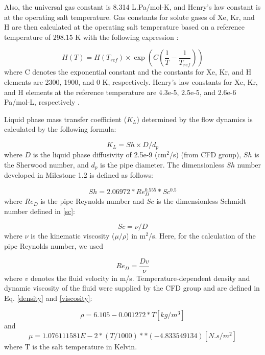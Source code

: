     Also, the universal gas constant is 8.314 L.Pa/mol-K, and Henry's law constant is at the operating salt temperature. Gas constants for solute gases of Xe, Kr, and H are then calculated at the operating salt temperature based on a reference temperature of 298.15 K with the following expression \cite{acp-15-4399-2015}:

    \begin{equation}\label{henry}
        H(T) = H(T_{ref})\times\exp(C(\frac{1}{T}-\frac{1}{T_{ref}}))
    \end{equation}
    where C denotes the exponential constant and the constants for Xe, Kr, and H elements are 2300, 1900, and 0 K, respectively. Henry's law constants for Xe, Kr, and H elements at the reference temperature are  4.3e-5, 2.5e-5, and 2.6e-6 Pa/mol-L, respectively \cite{acp-15-4399-2015}.

    Liquid phase mass transfer coefficient ($K_L$) determined by the flow dynamics is calculated by the following formula:

    \begin{equation}\label{kl}
        K_L = Sh \times D / d_p
    \end{equation}
    where $D$ is the liquid phase diffusivity of 2.5e-9 (cm$^2$/s) (from CFD group), $Sh$ is the Sherwood number, and $d_p$ is the pipe diameter. The dimensionless $Sh$ number developed in Milestone 1.2 is defined as follows:

    \begin{equation}\label{sh}
        Sh = 2.06972 * Re_D^{0.555} * Sc^{0.5}
    \end{equation}
    where $Re_D$ is the pipe Reynolds number and $Sc$ is the dimensionless Schmidt number defined in \ref{sc}:

    \begin{equation}\label{sc}
        Sc = \nu/D
    \end{equation}
    where $\nu$ is the kinematic viscosity ($\mu/\rho$) in m$^2$/s. Here, for the calculation of the pipe Reynolds number, we used

    \begin{equation}\label{reynold}
        Re_D = \frac{Dv}{\nu}
    \end{equation}
    where $v$ denotes the fluid velocity in m/s. Temperature-dependent density and dynamic viscosity of the fluid were supplied by the CFD group and are defined in Eq. \ref{density} and \ref{viscosity}:

    \begin{equation}\label{density}
        \rho = 6.105 - 0.001272 * T [kg/m^3]
    \end{equation}
    and
    \begin{equation}\label{viscosity}
        \mu = 1.076111581E-2 * (T / 1000)**(-4.833549134) [N.s/m^2]
    \end{equation}
    where T is the salt temperature in Kelvin.

